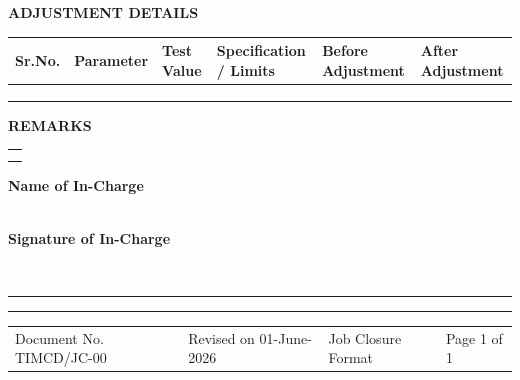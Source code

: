 \documentclass[a4paper,10pt]{article}
\newcommand{\sectiontitle}[1]{
\vspace{2mm}
\colorbox{sectiongray}{
\parbox{\dimexpr\linewidth-2\fboxsep}{
\textbf{\large #1}
}}
\vspace{1mm}
}
\begin{document}

\sectiontitle{ADJUSTMENT DETAILS}

\begin{tabularx}{\textwidth}
{|p{1cm}|X|p{2cm}|p{2.8cm}|p{3cm}|p{3cm}|}
\hline

\textbf{Sr.No.}
&
\textbf{Parameter}
&
\textbf{Test Value}
&
\textbf{Specification / Limits}
&
\textbf{Before Adjustment}
&
\textbf{After Adjustment}
\\
\hline

& & & & & \\
\hline

& & & & & \\
\hline

& & & & & \\
\hline

\end{tabularx}


\sectiontitle{REMARKS}

\begin{tabularx}{\textwidth}{|X|}
\hline

\\[5mm]

\\

\hline

\end{tabularx}

\vspace{5mm}

\begin{flushright}

\textbf{Name of In-Charge}

\\[3mm]

\textbf{Signature of In-Charge}

\\[3mm]

\rule{5cm}{0.4pt}

\end{flushright}

\vfill


\hrule
\vspace{2mm}

\footnotesize

\begin{tabularx}{\textwidth}{XXXX}
Document No. TIMCD/JC-00 &
Revised on 01-June-2026 &
Job Closure Format &
Page 1 of 1
\end{tabularx}
\end{document}
